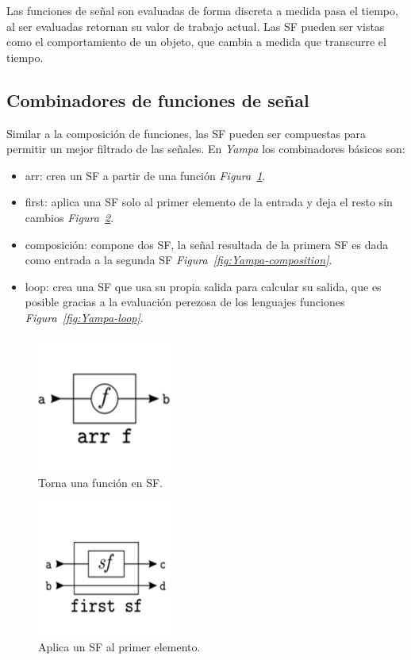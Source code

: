 Las funciones de señal son evaluadas de forma discreta a medida pasa el tiempo, al ser evaluadas retornan su valor de trabajo actual. Las SF pueden ser vistas como el comportamiento de un objeto, que cambia a medida que transcurre el tiempo.

\subsection{Combinadores de funciones de señal}

Similar a la composición de funciones, las SF pueden ser compuestas para permitir un mejor filtrado de las señales. En \emph{Yampa} los combinadores básicos son:

\begin{itemize}
\item arr: crea un SF a partir de una función \emph{Figura~\ref{fig:Yampa-arr}}.
\item first: aplica una SF solo al primer elemento de la entrada y deja el resto sin cambios \emph{Figura~\ref{fig:Yampa-first}}.
\item composición: compone dos SF, la señal resultada de la primera SF es dada como entrada a la segunda SF \emph{Figura~\ref{fig:Yampa-composition}}.
\item loop: crea una SF que usa su propia salida para calcular su salida, que es posible gracias a la evaluación perezosa de los lenguajes funciones \emph{Figura~\ref{fig:Yampa-loop}}.
\end{itemize}


\begin{figure}[htbp!]
\centering
\includegraphics[width=0.4\textwidth]{Yampa-arr}
\caption[Yampa-arr]{Torna una función en SF.}
\label{fig:Yampa-arr}
\end{figure}

\begin{figure}[htbp!]
\centering
\includegraphics[width=0.4\textwidth]{Yampa-first}
\caption[Yampa-first]{Aplica un SF al primer elemento.}
\label{fig:Yampa-first}
\end{figure}

